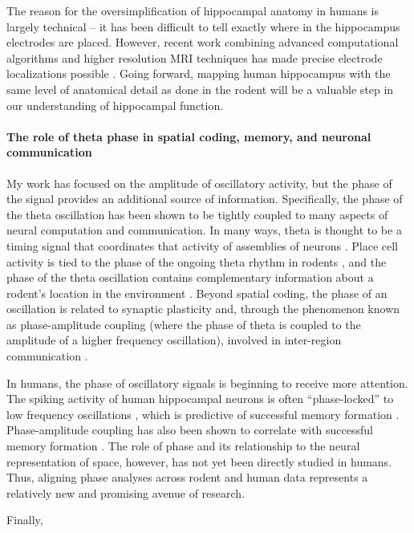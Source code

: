 The reason for the oversimplification of hippocampal anatomy in humans is largely technical -- it has been difficult to tell exactly where in the hippocampus electrodes are placed. However, recent work combining advanced computational algorithms and higher resolution MRI techniques has made precise electrode localizations possible \citep{YushEtal15,DyksEtal12}. Going forward, mapping human hippocampus with the same level of anatomical detail as done in the rodent will be a valuable step in our understanding of hippocampal function.



\paragraph{The role of theta phase in spatial coding, memory, and neuronal communication}
My work has focused on the amplitude of oscillatory activity, but the phase of the signal provides an additional source of information. Specifically, the phase of the theta oscillation has been shown to be tightly coupled to many aspects of neural computation and communication. In many ways, theta is thought to be a timing signal that coordinates that activity of assemblies of neurons \citep{Buzs05}. Place cell activity is tied to the phase of the ongoing theta rhythm in rodents \citep{OKeeRecc93,SkagEtal96}, and the phase of the theta oscillation contains complementary information about a rodent's location in the environment \citep{AgarEtal14}. Beyond spatial coding, the phase of an oscillation is related to synaptic plasticity \citep{BuzsDrag04,HuerLism93} and, through the phenomenon known as phase-amplitude coupling (where the phase of theta is coupled to the amplitude of a higher frequency oscillation), involved in inter-region communication \citep{ColgEtal09}.

In humans, the phase of oscillatory signals is beginning to receive more attention. The spiking activity of human hippocampal neurons is often ``phase-locked'' to low frequency oscillations \citep{JacoEtal07}, which is predictive of successful memory formation \citep{RutiEtal10}. Phase-amplitude coupling has also been shown to correlate with successful memory formation \citep{CanoEtal06,LegaEtal14}. The role of phase and its relationship to the neural representation of space, however, has not yet been directly studied in humans. Thus, aligning phase analyses across rodent and human data represents a relatively new and promising avenue of research.

Finally, 















